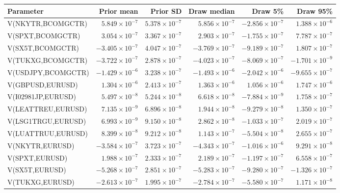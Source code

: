 \documentclass[10pt,a4paper]{article}
\begin{document}
\begin{tabular*}{\linewidth}{@{\extracolsep{\fill}}lrrrrr@{}}
\toprule
Parameter & Prior mean & Prior SD & Draw median & Draw 5\% & Draw 95\%\\
\midrule
V(NKYTR,BCOMGCTR) & $5.849\times10^{-7}$ & $5.378\times10^{-7}$ & $5.856\times10^{-7}$ & $-2.856\times10^{-7}$ & $1.388\times10^{-6}$ \\
V(SPXT,BCOMGCTR) & $3.054\times10^{-7}$ & $3.367\times10^{-7}$ & $2.903\times10^{-7}$ & $-1.755\times10^{-7}$ & $7.787\times10^{-7}$ \\
V(SX5T,BCOMGCTR) & $-3.405\times10^{-7}$ & $4.047\times10^{-7}$ & $-3.769\times10^{-7}$ & $-9.189\times10^{-7}$ & $1.807\times10^{-7}$ \\
V(TUKXG,BCOMGCTR) & $-3.722\times10^{-7}$ & $2.878\times10^{-7}$ & $-4.023\times10^{-7}$ & $-8.069\times10^{-7}$ & $-1.701\times10^{-9}$ \\
V(USDJPY,BCOMGCTR) & $-1.429\times10^{-6}$ & $3.238\times10^{-7}$ & $-1.493\times10^{-6}$ & $-2.042\times10^{-6}$ & $-9.655\times10^{-7}$ \\
V(GBPUSD,EURUSD) & $1.304\times10^{-6}$ & $2.413\times10^{-7}$ & $1.363\times10^{-6}$ & $1.056\times10^{-6}$ & $1.747\times10^{-6}$ \\
V(I02981JP,EURUSD) & $5.497\times10^{-8}$ & $5.244\times10^{-8}$ & $6.618\times10^{-8}$ & $-7.884\times10^{-9}$ & $1.758\times10^{-7}$ \\
V(LEATTREU,EURUSD) & $7.135\times10^{-9}$ & $6.896\times10^{-8}$ & $1.944\times10^{-8}$ & $-9.279\times10^{-8}$ & $1.350\times10^{-7}$ \\
V(LSG1TRGU,EURUSD) & $6.993\times10^{-9}$ & $9.150\times10^{-8}$ & $2.862\times10^{-8}$ & $-1.033\times10^{-7}$ & $2.019\times10^{-7}$ \\
V(LUATTRUU,EURUSD) & $8.399\times10^{-8}$ & $9.212\times10^{-8}$ & $1.143\times10^{-7}$ & $-5.504\times10^{-8}$ & $2.655\times10^{-7}$ \\
V(NKYTR,EURUSD) & $-3.584\times10^{-7}$ & $3.723\times10^{-7}$ & $-4.343\times10^{-7}$ & $-1.016\times10^{-6}$ & $9.291\times10^{-8}$ \\
V(SPXT,EURUSD) & $1.988\times10^{-7}$ & $2.333\times10^{-7}$ & $2.189\times10^{-7}$ & $-1.197\times10^{-7}$ & $6.558\times10^{-7}$ \\
V(SX5T,EURUSD) & $-5.268\times10^{-7}$ & $2.851\times10^{-7}$ & $-5.283\times10^{-7}$ & $-9.280\times10^{-7}$ & $-1.326\times10^{-7}$ \\
V(TUKXG,EURUSD) & $-2.613\times10^{-7}$ & $1.995\times10^{-7}$ & $-2.784\times10^{-7}$ & $-5.580\times10^{-7}$ & $1.171\times10^{-8}$ \\

\end{tabular*}
\end{document}

